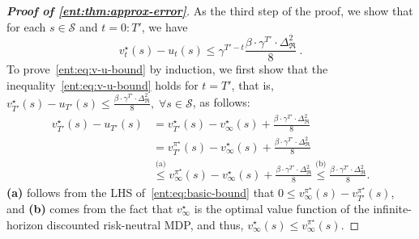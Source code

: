 \documentclass[twoside]{article}
\newcommand{\states}{\mathcal{S}}
\newcommand{\opt}{^\star}
\newcommand{\vspan}{\Delta_{\mathfrak{R}}}
\theoremstyle{plain}
\theoremstyle{definition}
\theoremstyle{remark}
\begin{document}
\begin{proof}[\bf\em Proof of \cref{ent:thm:approx-error}]
As the third step of the proof, we show that for each $s\in \states$ and $t = 0{:}T'$, we have 
%
\begin{equation}\label{ent:eq:v-u-bound}
 v_t\opt (s) - u_t(s) \le \gamma^{T' - t} \frac{\beta \cdot \gamma^{T'} \cdot \vspan^2}{8}~.
\end{equation}
%
To prove~\eqref{ent:eq:v-u-bound} by induction, we first show that the inequality~\eqref{ent:eq:v-u-bound} holds for $t=T'$, that is, $v_{T'}\opt (s) - u_{T'}(s) \leq \frac{\beta \cdot \gamma^{T'} \cdot \vspan^2}{8},\;\forall s\in\mathcal S$, as follows:
%
\begin{equation} \label{ent:eq:u-upper-bound}
\begin{aligned}
v_{T'}\opt (s) - u_{T'}(s) &= v_{T'}\opt (s) - v_{\infty}\opt(s) + \frac{\beta \cdot \gamma^{T'} \cdot \vspan^2}{8} \\ 
&= v_{T'}^{\pi\opt} (s) - v_{\infty}\opt(s) + \frac{\beta \cdot \gamma^{T'} \cdot \vspan^2}{8} \\
&\stackrel{\text{(a)}}{\leq} v_{\infty}^{\pi\opt} (s) - v_{\infty}\opt(s) + \frac{\beta \cdot \gamma^{T'} \cdot \vspan^2}{8} \stackrel{\text{(b)}}{\leq} \frac{\beta \cdot \gamma^{T'} \cdot \vspan^2}{8}. 
\end{aligned}
\end{equation}
%
{\bf (a)} follows from the LHS of~\eqref{ent:eq:basic-bound} that $0 \leq v_{\infty}^{\pi\opt} (s) - v_{T'}^{\pi\opt} (s)$, and {\bf (b)} comes from the fact that $v_{\infty}\opt$ is the optimal value function of the infinite-horizon discounted risk-neutral MDP, and thus, $v_{\infty}\opt(s) \leq v_{\infty}^{\pi\opt}(s)$.


\end{proof}
\end{document}
